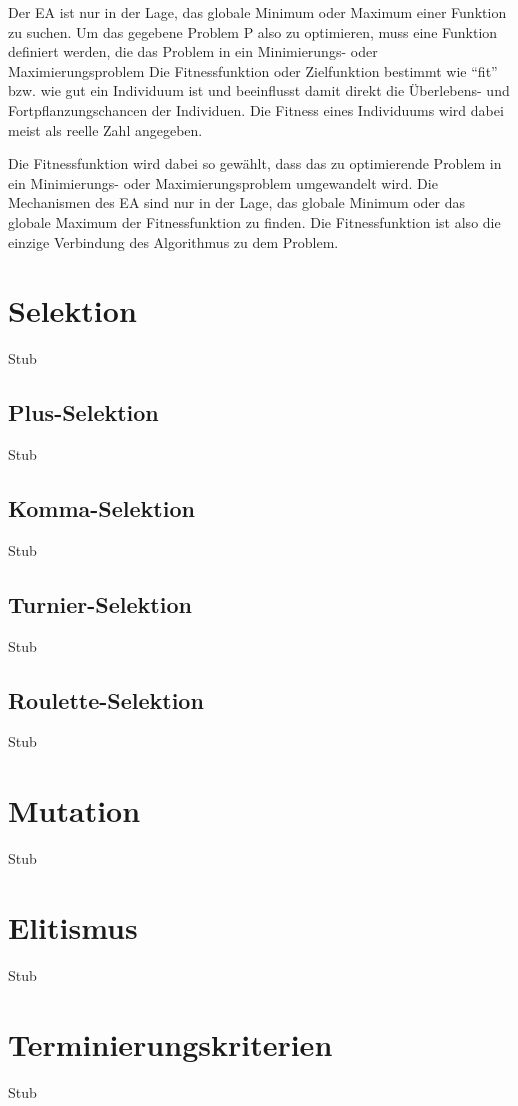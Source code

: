 Der EA ist nur in der Lage, das globale Minimum oder Maximum einer Funktion zu suchen. Um das gegebene Problem P also zu optimieren, muss eine Funktion definiert werden, die das Problem in ein Minimierungs- oder Maximierungsproblem 
Die Fitnessfunktion oder Zielfunktion bestimmt wie "`fit"' bzw. wie gut ein Individuum ist und beeinflusst damit direkt die Überlebens- und Fortpflanzungschancen der Individuen. Die Fitness eines Individuums wird dabei meist als reelle Zahl angegeben. 

Die Fitnessfunktion wird dabei so gewählt, dass das zu optimierende Problem in ein Minimierungs- oder Maximierungsproblem umgewandelt wird. Die Mechanismen des EA sind nur in der Lage, das globale Minimum oder das globale Maximum der Fitnessfunktion zu finden. Die Fitnessfunktion ist also die einzige Verbindung des Algorithmus zu dem Problem. 

\section{Selektion}
Stub

\subsection{Plus-Selektion}
Stub

\subsection{Komma-Selektion}
Stub

\subsection{Turnier-Selektion}
Stub

\subsection{Roulette-Selektion}
Stub

\section{Mutation}
Stub

\section{Elitismus}
Stub

\section{Terminierungskriterien}
Stub






























